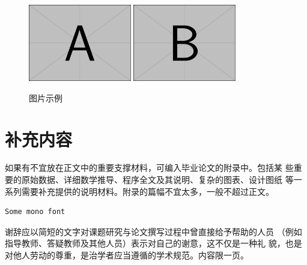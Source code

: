 \documentclass{swufethesis}
\begin{document}
\begin{figure}[htb]
  \centering
  \includegraphics[width=0.4\textwidth]{figures/example-image-a.pdf}
  \includegraphics[width=0.4\textwidth]{figures/example-image-b.pdf}
  \caption{图片示例}
\end{figure}

\printbibliography
\appendix
\chapter{补充内容}
如果有不宜放在正文中的重要支撑材料，可编入毕业论文的附录中。包括某
些重要的原始数据、详细数学推导、程序全文及其说明、复杂的图表、设计图纸
等一系列需要补充提供的说明材料。附录的篇幅不宜太多，一般不超过正文。
\begin{verbatim}
Some mono font
\end{verbatim}
\begin{acknowledgments}
  谢辞应以简短的文字对课题研究与论文撰写过程中曾直接给予帮助的人员
  （例如指导教师、答疑教师及其他人员）表示对自己的谢意，这不仅是一种礼
  貌，也是对他人劳动的尊重，是治学者应当遵循的学术规范。内容限一页。
\end{acknowledgments}
\end{document}
